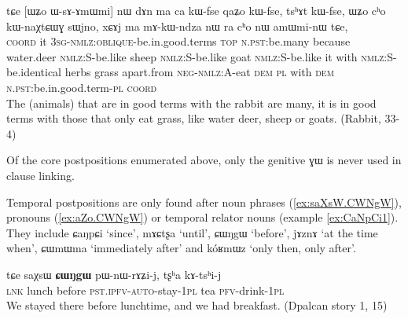\documentclass[oldfontcommands,oneside,a4paper,11pt]{article}
\newcommand{\ipa}[1]{{\phon \mbox{#1}}} %
\begin{document}
\begin{exe}
   \ex \label{ex:WsAmWmi}
 \gll 
\ipa{tɕe}   	[\ipa{ɯʑo}   	\ipa{ɯ-sɤ-ɤmɯmi}]   	\ipa{nɯ}   	\ipa{dɤn}   	\ipa{ma}   	\ipa{ca}   	\ipa{kɯ-fse}   	\ipa{qaʑo}   	\ipa{kɯ-fse,}   	\ipa{tsʰɤt}   	\ipa{kɯ-fse,}   	 \ipa{ɯʑo}   	\ipa{cʰo}   	\ipa{kɯ-naχtɕɯɣ}   	\ipa{sɯjno,}   	\ipa{xɕɤj}   	\ipa{ma}   	\ipa{mɤ-kɯ-ndza}   	\ipa{nɯ} \ipa{ra}   	\ipa{cʰo}   	\ipa{nɯ}   	\ipa{amɯmi-nɯ}   	\ipa{tɕe,}   \\
\textsc{coord} it \textsc{3sg-nmlz:oblique}-be.in.good.terms \textsc{top} \textsc{n.pst:}be.many because water.deer \textsc{nmlz:S}-be.like sheep \textsc{nmlz:S}-be.like goat  \textsc{nmlz:S}-be.like it with  \textsc{nmlz:S}-be.identical herbs grass apart.from \textsc{neg-nmlz:A}-eat \textsc{dem} \textsc{pl} with \textsc{dem} \textsc{n.pst}:be.in.good.term-\textsc{pl} \textsc{coord} \\
\glt The (animals) that are in good terms with the rabbit are many, it is in good terms with those that only eat grass, like water deer, sheep or goats. (Rabbit, 33-4)
\end{exe}

Of the core postpositions enumerated above, only the genitive \ipa{ɣɯ} is never used in clause linking.

Temporal postpositions   are only found after noun phrases (\ref{ex:saXsW.CWNgW}), pronouns (\ref{ex:aZo.CWNgW}) or temporal relator nouns (example \ref{ex:CaNpCi1}). They include  \ipa{ɕaŋpɕi} `since', \ipa{mɤɕtʂa} `until', \ipa{ɕɯŋgɯ} `before', \ipa{jɤznɤ} `at the time when',  \ipa{ɕɯmɯma} `immediately after' and \ipa{kóʁmɯz}   `only then, only after'.

\begin{exe}
   \ex \label{ex:saXsW.CWNgW}
 \gll 
\ipa{tɕe}  	\ipa{saχsɯ}  	\ipa{\textbf{ɕɯŋgɯ}}  	\ipa{pɯ-nɯ-rɤʑi-j,}  	\ipa{tʂʰa}  	\ipa{kɤ-tsʰi-j}  \\
\textsc{lnk} lunch before \textsc{pst.ipfv-auto}-stay-\textsc{1pl} tea \textsc{pfv}-drink-\textsc{1pl} \\
\glt  We stayed there before lunchtime, and we had breakfast. 
(Dpalcan story 1, 15)
\end{exe}
\end{document}
